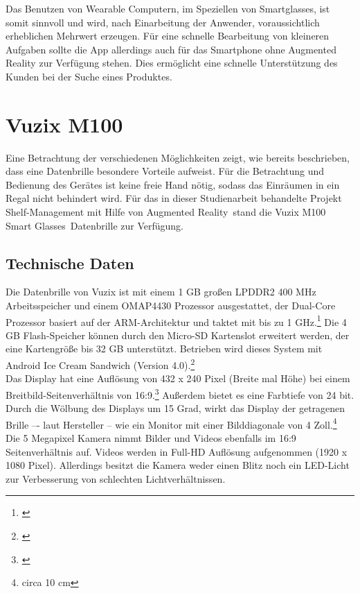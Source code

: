Das Benutzen von Wearable Computern, im Speziellen von Smartglasses, ist somit sinnvoll und wird, nach Einarbeitung der Anwender, voraussichtlich erheblichen Mehrwert erzeugen. Für eine schnelle Bearbeitung von kleineren Aufgaben sollte die App allerdings auch für das Smartphone ohne Augmented Reality zur Verfügung stehen. Dies ermöglicht \zB eine schnelle Unterstützung des Kunden bei der Suche eines Produktes.

\section{Vuzix M100}	
\label{sec:vuzix}
Eine Betrachtung der verschiedenen Möglichkeiten zeigt, wie bereits beschrieben, dass eine Datenbrille besondere Vorteile aufweist. Für die Betrachtung und Bedienung des Gerätes ist keine freie Hand nötig, sodass das Einräumen in ein Regal nicht behindert wird. Für das in dieser Studienarbeit behandelte Projekt \glqq Shelf-Management mit Hilfe von Augmented Reality\grqq\ stand die \glqq Vuzix M100 Smart Glasses\grqq\ Datenbrille zur Verfügung.

\subsection{Technische Daten}
Die Datenbrille von Vuzix ist mit einem 1 \ac{GB} großen LPDDR2 400 \ac{MHz} Arbeitsspeicher und einem OMAP4430 Prozessor ausgestattet, der Dual-Core Prozessor basiert auf der \acs{ARM}-Architektur und taktet mit bis zu 1 \ac{GHz}.\footnote{\citep{omap4430}} Die 4 \ac{GB} Flash-Speicher können durch den Micro-\acs{SD} Kartenslot erweitert werden, der eine Kartengröße bis 32 \ac{GB} unterstützt. Betrieben wird dieses System mit Android Ice Cream Sandwich (Version 4.0).\footnote{\citep{vuzixm100}}\\

Das Display hat eine Auflösung von 432 x 240 Pixel (Breite mal Höhe) bei einem Breitbild-Seitenverhältnis von 16:9.\footnote{\citep{wqvga}} Außerdem bietet es eine Farbtiefe von 24 bit. Durch die Wölbung des Displays um 15 Grad, wirkt das Display der getragenen Brille –- laut Hersteller -- wie ein Monitor mit einer Bilddiagonale von 4 Zoll.\footnote{circa 10 \ac{cm}}\\

Die 5 Megapixel Kamera nimmt Bilder und Videos ebenfalls im 16:9 Seitenverhältnis auf. Videos werden in Full-\acs{HD} Auflösung aufgenommen (1920 x 1080 Pixel). Allerdings besitzt die Kamera weder einen Blitz noch ein LED-Licht zur Verbesserung von schlechten Lichtverhältnissen.\\


